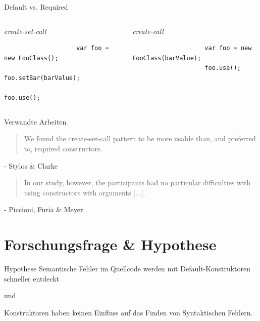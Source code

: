 \documentclass[10pt]{beamer}
\begin{document}
	\begin{frame}[fragile]{Default vs. Required}
		\begin{columns}[T,onlytextwidth]
			
			\begin{column}{0.45\textwidth}
				\begin{center}\textit{create-set-call}\end{center}
				\begin{verbatim}
					var foo = new FooClass();
					foo.setBar(barValue);
					foo.use();
				\end{verbatim}
			\end{column}
			\vrule{}
			\begin{column}{0.02\textwidth}
			\end{column}
			\begin{column}{0.53\textwidth}
				\begin{center}\textit{create-call}\end{center}
				\begin{verbatim}
					var foo = new FooClass(barValue);
					foo.use();
				\end{verbatim}
			\end{column}
			
		\end{columns}
	\end{frame}

	\begin{frame}{Verwandte Arbeiten}
		\begin{quote}
			We found the create-set-call pattern to be more
			usable than, and preferred to, required constructors.
		\end{quote}
		\hfill - Stylos \& Clarke\\
		\vspace{\baselineskip}
		\vspace{\baselineskip}
		\begin{quote}
			In our study, however, the participants had no particular
			difficulties with using constructors with arguments [...]. 
		\end{quote}
		\hfill - Piccioni, Furia \& Meyer
	
	
	\end{frame}

\section{Forschungsfrage \& Hypothese}

	\begin{frame}[standout]{Hypothese}
		Semantische Fehler im Quellcode werden mit Default-Konstruktoren schneller entdeckt
		\begin{center}\small{und}\end{center}
		Konstruktoren haben keinen Einfluss auf das Finden von Syntaktischen Fehlern.
	\end{frame}
\end{document}
